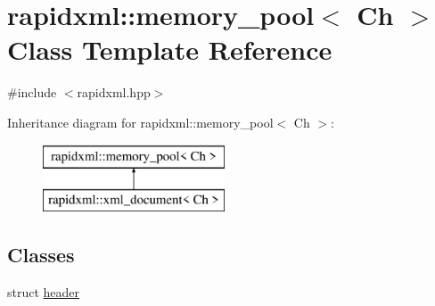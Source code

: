 \hypertarget{classrapidxml_1_1memory__pool}{}\section{rapidxml\+:\+:memory\+\_\+pool$<$ Ch $>$ Class Template Reference}
\label{classrapidxml_1_1memory__pool}


{\ttfamily \#include $<$rapidxml.\+hpp$>$}

Inheritance diagram for rapidxml\+:\+:memory\+\_\+pool$<$ Ch $>$\+:\begin{figure}[H]
\begin{center}
\leavevmode
\includegraphics[height=2.000000cm]{classrapidxml_1_1memory__pool}
\end{center}
\end{figure}
\subsection*{Classes}
\begin{DoxyCompactItemize}
\item 
struct \hyperlink{structrapidxml_1_1memory__pool_1_1header}{header}
\end{DoxyCompactItemize}
